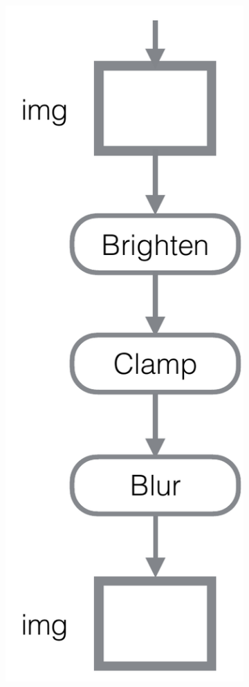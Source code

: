 \begin{figure}[ht]

\begin{subfigure}{.1\textwidth}
 \includegraphics[scale=0.2]{./figures/motivating_example.pdf}


\end{subfigure}
\end{figure}
